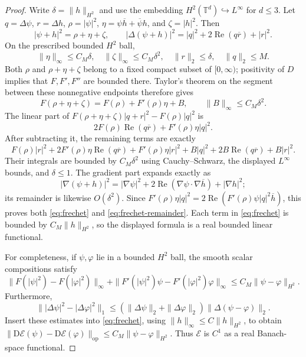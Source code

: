 \documentclass[11pt]{article}
\newcommand{\EE}{\mathcal E}
\newcommand{\DD}{\mathrm D}
\newcommand{\Rea}{\operatorname{Re}}
\begin{document}
\begin{proof}
Write $\delta=\|h\|_{H^2}$ and use the embedding
$H^2(\mathbb T^d)\hookrightarrow L^\infty$ for $d\le3$.
Let $q=\Delta\psi$, $r=\Delta h$, $\rho=|\psi|^2$,
$\eta=\psi\overline h+\overline\psi h$, and $\zeta=|h|^2$.
Then
\[
 |\psi+h|^2=\rho+\eta+\zeta,\qquad
 |\Delta(\psi+h)|^2
 =|q|^2+2\Rea(q\overline r)+|r|^2.
\]
On the prescribed bounded $H^2$ ball,
\[
 \|\eta\|_\infty\le C_M\delta,\quad
 \|\zeta\|_\infty\le C_M\delta^2,\quad
 \|r\|_2\le\delta,\quad
 \|q\|_2\le M.
\]
Both $\rho$ and $\rho+\eta+\zeta$ belong to a fixed compact subset
of $[0,\infty)$; positivity of $D$ implies that $F,F',F''$ are
bounded there. Taylor's theorem on the segment between these
nonnegative endpoints therefore gives
\[
 F(\rho+\eta+\zeta)=F(\rho)+F'(\rho)\eta+B,\qquad
 \|B\|_\infty\le C_M\delta^2.
\]
The linear part of
$F(\rho+\eta+\zeta)|q+r|^2-F(\rho)|q|^2$ is
\[
 2F(\rho)\Rea(q\overline r)
       +F'(\rho)\eta|q|^2.
\]
After subtracting it, the remaining terms are exactly
\[
 F(\rho)|r|^2
 +2F'(\rho)\eta\Rea(q\overline r)
 +F'(\rho)\eta|r|^2
 +B|q|^2+2B\Rea(q\overline r)+B|r|^2.
\]
Their integrals are bounded by $C_M\delta^2$ using
Cauchy--Schwarz, the displayed $L^\infty$ bounds, and $\delta\le1$.
The gradient part expands exactly as
\[
 |\nabla(\psi+h)|^2
 =|\nabla\psi|^2
   +2\Rea(\nabla\psi\cdot\nabla\overline h)
   +|\nabla h|^2;
\]
its remainder is likewise $O(\delta^2)$.
Since
$F'(\rho)\eta|q|^2
 =2\Rea(F'(\rho)\psi|q|^2\overline h)$,
this proves both \eqref{eq:frechet} and
\eqref{eq:frechet-remainder}. Each term in
\eqref{eq:frechet} is bounded by $C_M\|h\|_{H^2}$,
so the displayed formula is a real bounded linear functional.

For completeness, if $\psi,\varphi$ lie in a bounded $H^2$ ball,
the smooth scalar compositions satisfy
\[
 \|F(|\psi|^2)-F(|\varphi|^2)\|_\infty+
 \|F'(|\psi|^2)\psi-F'(|\varphi|^2)\varphi\|_\infty
 \le C_M\|\psi-\varphi\|_{H^2}.
\]
Furthermore,
\[
 \bigl\||\Delta\psi|^2-|\Delta\varphi|^2\bigr\|_1
 \le(\|\Delta\psi\|_2+\|\Delta\varphi\|_2)
       \|\Delta(\psi-\varphi)\|_2 .
\]
Insert these estimates into \eqref{eq:frechet}, using
$\|h\|_\infty\le C\|h\|_{H^2}$, to obtain
$\|\DD\EE(\psi)-\DD\EE(\varphi)\|_{\mathrm{op}}
 \le C_M\|\psi-\varphi\|_{H^2}$.
Thus $\EE$ is $C^1$ as a real Banach-space functional.
\end{proof}
\end{document}
